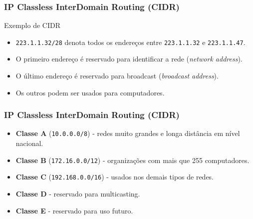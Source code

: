 \documentclass[xcolor=dvipsnames,10pt,compress,aspectratio=169]{beamer}
\begin{document}
\begin{frame}[fragile]
  \frametitle{IP Classless InterDomain Routing (CIDR)}
  \begin{exampleblock}{Exemplo de CIDR}
    \begin{itemize}
    \item \verb+223.1.1.32/28+ denota todos os endereços entre \verb+223.1.1.32+ e
      \verb+223.1.1.47+.
    \item O primeiro endereço é reservado para  identificar a rede (\emph{network address}).
    \item O último endereço é reservado para broadcast (\emph{broadcast address}).
    \item Os  outros podem ser usados para computadores.
    \end{itemize}
  \end{exampleblock}
\end{frame}

\begin{frame}[fragile]
  \frametitle{IP Classless InterDomain Routing (CIDR)}
  \begin{itemize}
  \item {\bf Classe A} (\verb+10.0.0.0/8+) - redes muito grandes e longa distância em nível nacional. 
  \item {\bf Classe B} (\verb+172.16.0.0/12+) - organizações com mais que 255 computadores.
  \item {\bf Classe C} (\verb+192.168.0.0/16+) - usados nos demais tipos de redes.
  \item {\bf Classe D} - reservado para multicasting.
  \item {\bf Classe E} - reservado para uso futuro.
  \end{itemize}
\end{frame}
\end{document}
